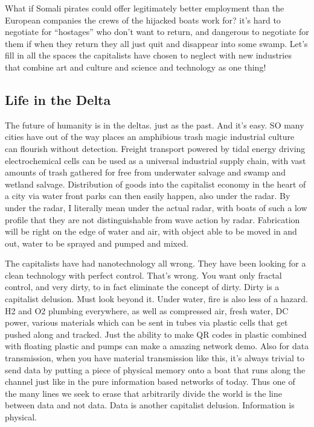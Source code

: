 What if Somali pirates could offer legitimately better employment than
the European companies the crews of the hijacked boats work for? it's
hard to negotiate for ``hostages'' who don't want to return, and
dangerous to negotiate for them if when they return they all just quit
and disappear into some swamp. Let's fill in all the spaces the
capitalists have chosen to neglect with new industries that combine art
and culture and science and technology as one thing!

\subsection{Life in the Delta}\label{life-in-the-delta}

The future of humanity is in the deltas. just as the past. And it's
easy. SO many cities have out of the way places an amphibious trash
magic industrial culture can flourish without detection. Freight
transport powered by tidal energy driving electrochemical cells can be
used as a universal industrial supply chain, with vast amounts of trash
gathered for free from underwater salvage and swamp and wetland salvage.
Distribution of goods into the capitalist economy in the heart of a city
via water front parks can then easily happen, also under the radar. By
under the radar, I literally mean under the actual radar, with boats of
such a low profile that they are not distinguishable from wave action by
radar. Fabrication will be right on the edge of water and air, with
object able to be moved in and out, water to be sprayed and pumped and
mixed.

The capitalists have had nanotechnology all wrong. They have been
looking for a clean technology with perfect control. That's wrong. You
want only fractal control, and very dirty, to in fact eliminate the
concept of dirty. Dirty is a capitalist delusion. Must look beyond it.
Under water, fire is also less of a hazard. H2 and O2 plumbing
everywhere, as well as compressed air, fresh water, DC power, various
materials which can be sent in tubes via plastic cells that get pushed
along and tracked. Just the ability to make QR codes in plastic combined
with floating plastic and pumps can make a amazing network demo. Also
for data transmission, when you have material transmission like this,
it's always trivial to send data by putting a piece of physical memory
onto a boat that runs along the channel just like in the pure
information based networks of today. Thus one of the many lines we seek
to erase that arbitrarily divide the world is the line between data and
not data. Data is another capitalist delusion. Information is physical.

